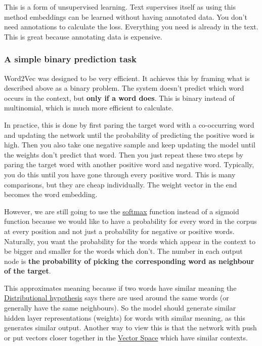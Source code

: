 \documentclass[
  11pt,
  british,
]{article}
\begin{document}
This is a form of unsupervised learning. Text supervises itself as using
this method embeddings can be learned without having annotated data. You
don't need annotations to calculate the loss. Everything you need is
already in the text. This is great because annotating data is expensive.

\hypertarget{a-simple-binary-prediction-task}{%
\subsubsection{A simple binary prediction
task}\label{a-simple-binary-prediction-task}}

Word2Vec was designed to be very efficient. It achieves this by framing
what is described above as a binary problem. The system doesn't predict
which word occurs in the context, but \textbf{only if a word does}. This
is binary instead of multinomial, which is much more efficient to
calculate.

In practice, this is done by first paring the target word with a
co-occurring word and updating the network until the probability of
predicting the positive word is high. Then you also take one negative
sample and keep updating the model until the weights don't predict that
word. Then you just repeat these two steps by paring the target word
with another positive word and negative word. Typically, you do this
until you have gone through every positive word. This is many
comparisons, but they are cheap individually. The weight vector in the
end becomes the word embedding.

However, we are still going to use the
\href{../Classification/Logistic\%20Regression.md}{softmax} function
instead of a sigmoid function because we would like to have a
probability for every word in the corpus at every position and not just
a probability for negative or positive words. Naturally, you want the
probability for the words which appear in the context to be bigger and
smaller for the words which don't. The number in each output node is
\textbf{the probability of picking the corresponding word as neighbour
of the target}.

This approximates meaning because if two words have similar meaning the
\href{Distributional\%20hypothesis.md}{Distributional hypothesis} says
there are used around the same words (or generally have the same
neighbours). So the model should generate similar hidden layer
representations (weights) for words with similar meaning, as this
generates similar output. Another way to view this is that the network
with push or put vectors closer together in the
\href{Vector\%20Space.md}{Vector Space} which have similar contexts.
\end{document}
